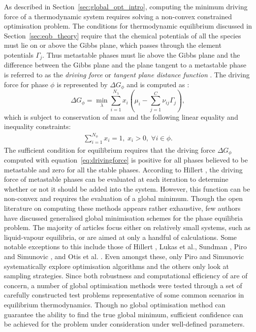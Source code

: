 	As described in Section~\ref{sec:global_opt_intro}, computing the minimum driving force of a thermodynamic system requires solving a non-convex constrained optimisation problem. The conditions for thermodynamic equilibrium discussed in Section~\ref{sec:eqb_theory} require that the chemical potentials of all the species must lie on or above the Gibbs plane, which passes through the element potentials $\Gamma_j$. Thus metastable phases must lie above the Gibbs plane and the difference between the Gibbs plane and the plane tangent to a metastable phase is referred to as the \emph{driving force} \cite{Lukas07} or \emph{tangent plane distance function} \cite{Lukas07,Zhang11}. The driving force for phase $\phi$ is represented by $\Delta G_{\phi}$ and is computed as \cite{Piro16}:
	\begin{equation}\label{eq:drivingforce}
        		\Delta G_{\phi}= \min_{\lambda} \sum_{i=1}^{N_{\lambda}}x_{i} \left (\mu_{i} - \sum_{j=1}^C \nu_{ij}\Gamma_j \right ),
    	\end{equation}
	which is subject to conservation of mass and the following linear equality and inequality constraints:
	\begin{align}
		\sum_{i=1}^{N_\phi} x_i = 1, \; x_i > 0, \; \forall i \in \phi.
	\end{align}
	The sufficient condition for equilibrium requires that the driving force $\Delta G_{\phi}$ computed with equation~\eqref{eq:drivingforce} is positive for all phases believed to be metastable and zero for all the stable phases. According to Hillert \cite{Hillert81}, the driving force of metastable phases can be evaluated at each iteration to determine whether or not it should be added into the system. However, this function can be non-convex and requires the evaluation of a global minimum. Though the open literature on computing these methods appears rather exhaustive, few authors have discussed generalised global minimisation schemes for the phase equilibria problem. The majority of articles focus either on relatively small systems, such as liquid-vapour equilibria, or are aimed at only a handful of calculations. Some notable exceptions to this include those of Hillert \cite{HILLERT198131}, Lukas et al.\cite{LUKAS1982229}, Sundman \cite{Sundman15}, Piro and Simunovic \cite{Piro16}, and Otis et al. \cite{Otis:2017ab}. Even amongst these, only Piro and Simunovic \cite{Piro16} systematically explore optimisation algorithms and the others only look at sampling strategies. Since both robustness and computational efficiency of {\GEM} are of concern, a number of global optimisation methods were tested through a set of carefully constructed test problems representative of some common scenarios in equilibrium thermodynamics. Though no global optimisation method can guarantee the ability to find the true global minimum, sufficient confidence can be achieved for the problem under consideration under well-defined parameters.
	
